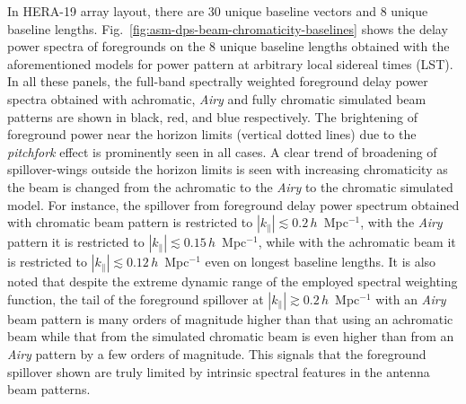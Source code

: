 \documentclass[preprint2,iop,numberedappendix,twocolappendix,appendixfloats]{emulateapj}
\begin{document}
\begin{figure}[htb]
  \label{fig:window-functions}
\end{figure}

In HERA-19 array layout, there are 30 unique baseline vectors and 8 unique baseline lengths. Fig.~\ref{fig:asm-dps-beam-chromaticity-baselines} shows the delay power spectra of foregrounds on the 8 unique baseline lengths obtained with the aforementioned models for power pattern at arbitrary local sidereal times (LST). In all these panels, the full-band spectrally weighted foreground delay power spectra obtained with achromatic, {\it Airy} and fully chromatic simulated beam patterns are shown in black, red, and blue respectively. The brightening of foreground power near the horizon limits (vertical dotted lines) due to the {\it pitchfork} effect \citep{thy15a,thy15b} is prominently seen in all cases. A clear trend of broadening of spillover-wings outside the horizon limits is seen with increasing chromaticity as the beam is changed from the achromatic to the {\it Airy} to the chromatic simulated model. For instance, the spillover from foreground delay power spectrum obtained with chromatic beam pattern is restricted to $|k_\parallel| \lesssim 0.2\,h$~Mpc$^{-1}$, with the {\it Airy} pattern it is restricted to $|k_\parallel| \lesssim 0.15\,h$~Mpc$^{-1}$, while with the achromatic beam it is restricted to $|k_\parallel| \lesssim 0.12\,h$~Mpc$^{-1}$ even on longest baseline lengths. It is also noted that despite the extreme dynamic range of the employed spectral weighting function, the tail of the foreground spillover at $|k_\parallel| \gtrsim 0.2\,h$~Mpc$^{-1}$ with an {\it Airy} beam pattern is many orders of magnitude higher than that using an achromatic beam while that from the simulated chromatic beam is even higher than from an {\it Airy} pattern by a few orders of magnitude. This signals that the foreground spillover shown are truly limited by intrinsic spectral features in the antenna beam patterns. 
\end{document}
